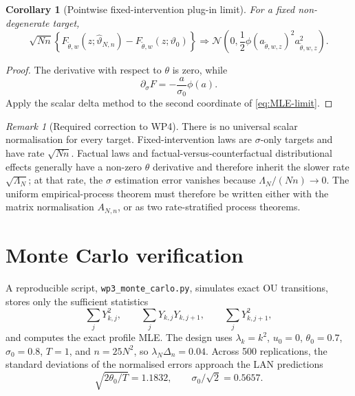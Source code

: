 \documentclass[11pt]{article}
\newtheorem{corollary}[assumption]{Corollary}
\theoremstyle{remark}
\newtheorem{remark}[assumption]{Remark}
\newcommand{\1}{\mathbf 1}
\newcommand{\LamN}{\Lambda_N}
\newcommand{\An}{A_{N,n}}
\newcommand{\vzero}{\vartheta_0}
\begin{document}
\begin{corollary}[Pointwise fixed-intervention plug-in limit]\label{cor:cf-pointwise}
For a fixed non-degenerate target,
\begin{equation}\label{eq:cf-pointwise}
 \sqrt{Nn}\left\{
 F_{\widetilde\theta,w}(z;\widehat\vartheta_{N,n})
 -F_{\widetilde\theta,w}(z;\vzero)
 \right\}
 \Rightarrow
 \mathcal N\!\left(
 0,\frac12\phi(a_{\widetilde\theta,w,z})^2
 a_{\widetilde\theta,w,z}^2
 \right).
\end{equation}
\end{corollary}

\begin{proof}
The derivative with respect to $\theta$ is zero, while
\[
 \partial_\sigma F
 =-\frac{a}{\sigma_0}\phi(a).
\]
Apply the scalar delta method to the second coordinate of \eqref{eq:MLE-limit}.
\end{proof}

\begin{remark}[Required correction to WP4]
There is no universal scalar normalisation for every target.  Fixed-intervention laws are $\sigma$-only targets and have rate $\sqrt{Nn}$.  Factual laws and factual-versus-counterfactual distributional effects generally have a non-zero $\theta$ derivative and therefore inherit the slower rate $\sqrt{\LamN}$; at that rate, the $\sigma$ estimation error vanishes because $\LamN/(Nn)\to0$.  The uniform empirical-process theorem must therefore be written either with the matrix normalisation $\An$, or as two rate-stratified process theorems.
\end{remark}

\section{Monte Carlo verification}

A reproducible script, \texttt{wp3\_monte\_carlo.py}, simulates exact OU transitions, stores only the sufficient statistics
\[
 \sum_jY_{k,j}^2,
 \qquad
 \sum_jY_{k,j}Y_{k,j+1},
 \qquad
 \sum_jY_{k,j+1}^2,
\]
and computes the exact profile MLE.  The design uses $\lambda_k=k^2$, $u_0=0$, $\theta_0=0.7$, $\sigma_0=0.8$, $T=1$, and $n=25N^2$, so $\lambda_N\Delta_n=0.04$.  Across 500 replications, the standard deviations of the normalised errors approach the LAN predictions
\[
 \sqrt{2\theta_0/T}=1.1832,
 \qquad
 \sigma_0/\sqrt2=0.5657.
\]
\end{document}
